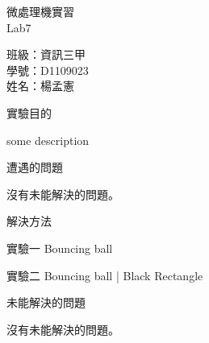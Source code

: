 \documentclass[12pt, a4paper]{article}
\begin{document}
\begin{center}
  {\Huge 微處理機實習} \\[2.5cm]
  {\Huge Lab7} \\[1.5cm]
  \hspace{.6in}
  \begin{minipage}[t]{.4\linewidth}
    {\Large 班級：資訊三甲}\\[0.5cm]
    {\Large 學號：D1109023}\\[0.5cm]
    {\Large 姓名：楊孟憲}
  \end{minipage}    
\end{center}

\newpage

\begin{description}
  \fontsize{18pt}{22pt}\selectfont 
    \item [一、]實驗目的 \\
      \begin{samepage}
        \fontsize{14pt}{16pt}\selectfont
          some description
        \end{samepage}

    \item [二、]遭遇的問題 \\
      \begin{samepage}
        \fontsize{14pt}{16pt} \selectfont
        沒有未能解決的問題。
      \end{samepage}

    \item [三、]解決方法
      \begin{description}
        \fontsize{16pt}{18pt}\selectfont
        \item [$\bullet$]實驗一 Bouncing ball \\
        
        \item [$\bullet$]實驗二 Bouncing ball |  Black Rectangle \\
        
      \end{description}
    \item [四、]未能解決的問題 \\[.6cm]
      \begin{minipage}[t]{\linewidth}
        \fontsize{14pt}{16pt}\selectfont
        沒有未能解決的問題。
      \end{minipage}
  \normalsize
\end{description}
\end{document}
